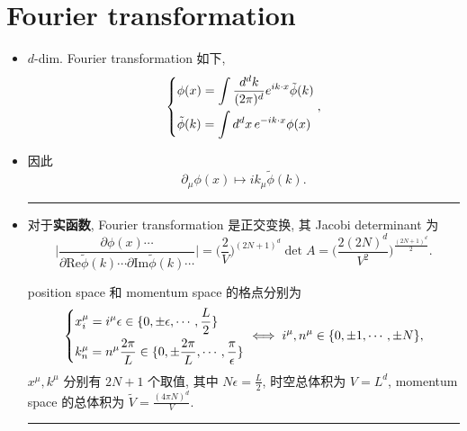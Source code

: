 \section{Fourier transformation}
\begin{itemize}
	\item $d$-dim. Fourier transformation 如下,
	\begin{equation} \label{A.2.1}
		\begin{dcases}
			\phi(x) = \int \frac{d^d k}{(2 \pi)^d} e^{i k \cdot x} \tilde{\phi}(k) \\
			\tilde{\phi}(k) = \int d^d x \, e^{- i k \cdot x} \phi(x)
		\end{dcases},
	\end{equation}
	
	\item 因此
	\begin{equation}
		\partial_\mu \phi(x) \mapsto i k_\mu \tilde{\phi}(k).
	\end{equation}
	
	\noindent\rule[0.5ex]{\linewidth}{0.5pt} %
	
	\item 对于\textbf{实函数}, Fourier transformation 是正交变换, 其 Jacobi determinant 为
	\begin{equation} \label{A.2.3}
		\Big| \frac{\partial \phi(x) \cdots}{\partial \mathrm{Re} \tilde{\phi}(k) \cdots \partial \mathrm{Im} \tilde{\phi}(k) \cdots} \Big| = \Big( \frac{2}{V} \Big)^{(2 N + 1)^d} \det A = \Big( \frac{2 (2 N)^d}{V^2} \Big)^{\frac{(2 N + 1)^d}{2}}.
	\end{equation}
	
	\begin{tcolorbox}[title=proof:]
		position space 和 momentum space 的格点分别为
		\begin{equation}
			\begin{dcases}
				x_i^\mu = i^\mu \epsilon \in \{0, \pm \epsilon, \cdots, \frac{L}{2}\} \\
				k_n^\mu = n^\mu \frac{2 \pi}{L} \in \{0, \pm \frac{2 \pi}{L}, \cdots, \frac{\pi}{\epsilon}\}
			\end{dcases} \iff i^\mu, n^\mu \in \{0, \pm 1, \cdots, \pm N\},
		\end{equation}
		$x^\mu, k^\mu$ 分别有 $2 N + 1$ 个取值, 其中 $N \epsilon = \frac{L}{2}$, 时空总体积为 $V = L^d$, momentum space 的总体积为 $\tilde{V} = \frac{(4 \pi N)^d}{V}$.
		
		\noindent\rule[0.5ex]{\linewidth}{0.5pt} %
		

\end{tcolorbox}
\end{itemize}
